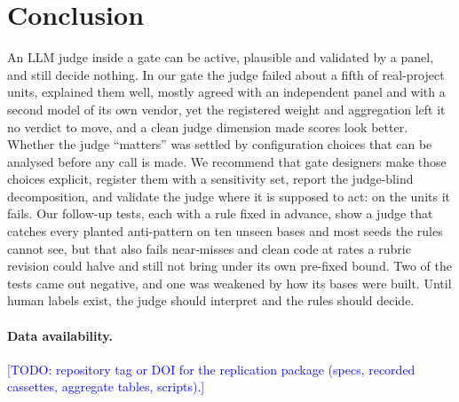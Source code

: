 \documentclass[10pt,a4paper]{article}
\newcommand{\todo}[1]{\textcolor{blue}{[TODO: #1]}}
\begin{document}
\section{Conclusion}\label{sec:conclusion}

An LLM judge inside a gate can be active, plausible and validated by a panel, and still decide nothing. In our gate
the judge failed about a fifth of real-project units, explained them well, mostly agreed with an independent panel
and with a second model of its own vendor, yet the registered weight and aggregation left it no verdict to move, and a clean judge dimension made scores
look better. Whether the judge ``matters'' was settled by configuration choices that can be analysed before any call
is made. We recommend that gate designers make those choices explicit, register them with a sensitivity set, report
the judge-blind decomposition, and validate the judge where it is supposed to act: on the units it fails. Our follow-up
tests, each with a rule fixed in advance, show a judge that catches every planted anti-pattern on ten unseen bases and
most seeds the rules cannot see, but that also fails near-misses and clean code at rates a rubric revision could
halve and still not bring under its own pre-fixed bound. Two of the tests came out negative, and one was weakened by
how its bases were built. Until human labels exist, the judge should interpret and the rules should decide.

\paragraph{Data availability.} \todo{repository tag or DOI for the replication package (specs, recorded cassettes,
aggregate tables, scripts).}



\end{document}

